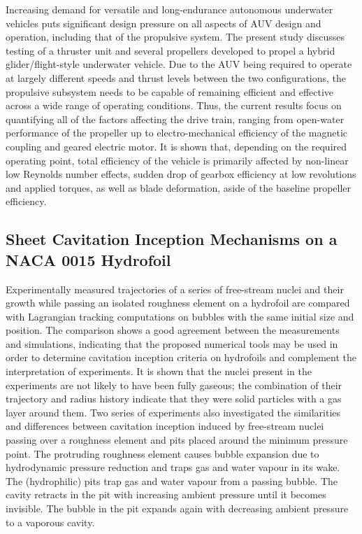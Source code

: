 \documentclass[a4paper,10pt]{article}
\begin{document}
Increasing demand for versatile and long-endurance autonomous underwater vehicles puts significant design pressure on all aspects of AUV design and operation, including that of the propulsive system. The present study discusses testing of a thruster unit and several propellers developed to propel a hybrid glider/flight-style underwater vehicle. Due to the AUV being required to operate at largely different speeds and thrust levels between the two configurations, the propulsive subsystem needs to be capable of remaining efficient and effective across a wide range of operating conditions. Thus, the current results focus on quantifying all of the factors affecting the drive train, ranging from open-water performance of the propeller up to electro-mechanical efficiency of the magnetic coupling and geared electric motor. It is shown that, depending on the required operating point, total efficiency of the vehicle is primarily affected by non-linear low Reynolds number effects, sudden drop of gearbox efficiency at low revolutions and applied torques, as well as blade deformation, aside of the baseline propeller efficiency.

\subsection{Sheet Cavitation Inception Mechanisms on a NACA 0015 Hydrofoil \cite{Rijsbergen2020}}

Experimentally measured trajectories of a series of free-stream nuclei and their growth while passing an isolated roughness element on a hydrofoil are compared with Lagrangian tracking computations on bubbles with the same initial size and position. The comparison shows a good agreement between the measurements and simulations, indicating that the proposed numerical tools may be used in order to determine cavitation inception criteria on hydrofoils and complement the interpretation of experiments. It is shown that the nuclei present in the experiments are not likely to have been fully gaseous; the combination of their trajectory and radius history indicate that they were solid particles with a gas layer around them.
Two series of experiments also investigated the similarities and differences between cavitation inception induced by free-stream nuclei passing over a roughness element and pits placed around the minimum pressure point. The protruding roughness element causes bubble expansion due to hydrodynamic pressure reduction and traps gas and water vapour in its wake. The (hydrophilic) pits trap gas and water vapour from a passing bubble. The cavity retracts in the pit with increasing ambient pressure until it becomes invisible. The bubble in the pit expands again with decreasing ambient pressure to a vaporous cavity.
\end{document}
